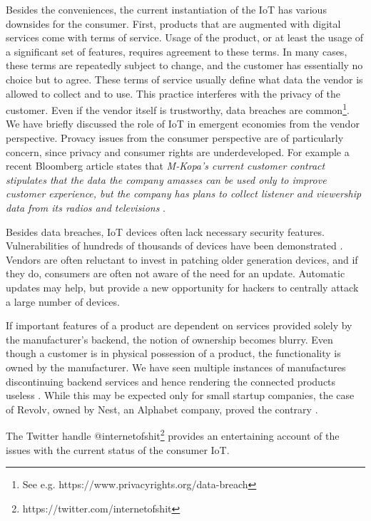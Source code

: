 Besides the conveniences, the current instantiation of the IoT has various downsides for the consumer. First, products that are augmented with digital services come with terms of service. Usage of the product, or at least the usage of a significant set of features, requires agreement to these terms. In many cases, these terms are repeatedly subject to change, and the customer has essentially no choice but to agree. These terms of service usually define what data the vendor is allowed to collect and to use.
This practice interferes with the privacy of the customer. Even if the vendor itself is trustworthy, data breaches are common\footnote{See e.g. https://www.privacyrights.org/data-breach}. We have briefly discussed the role of IoT in emergent economies from the vendor perspective. Provacy issues from the consumer perspective are of  particularly concern, since privacy and consumer rights are underdeveloped. For example  a recent Bloomberg article states that \emph{M-Kopa’s current customer contract stipulates that the data the company amasses can be used only to improve customer experience, but the company has plans to collect listener and viewership data from its radios and televisions} \parencite{Faris2015}. 

Besides data breaches, IoT devices often lack necessary security features. Vulnerabilities of hundreds of thousands of devices have been demonstrated \parencite{7546527,Bodenheim2014114,184449,garcia2016lock}. Vendors are often reluctant to invest in patching older generation devices, and if they do, consumers are often not aware of the need for an update. Automatic updates may help, but provide a new opportunity for hackers to centrally attack a large number of devices.

If important features of a product are dependent on services provided solely by the manufacturer's backend, the notion of ownership becomes blurry. Even though a customer is in physical possession of a product, the functionality is owned by the manufacturer. We have seen multiple instances of manufactures discontinuing backend services and hence rendering the connected products useless \parencite{Cox2016}. While this may be expected only for small startup companies, the case of Revolv, owned by Nest, an Alphabet company, proved the contrary \parencite{Gilbert2016}.

The Twitter handle @internetofshit\footnote{https://twitter.com/internetofshit} provides an entertaining account of the issues with the current status of the consumer IoT.

